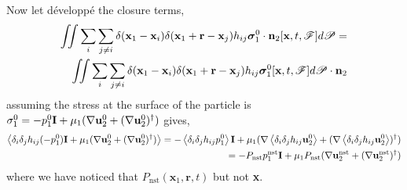 \documentclass[12pt]{My_preprint}
\begin{document}
Now let développé the closure terms,
\begin{align*}
    \iint
    \sum_i  
    \sum_{j\neq i}
    \delta(\textbf{x}_1-\textbf{x}_i)
    \delta(\textbf{x}_1+\textbf{r}-\textbf{x}_j)h_{ij} 
    \bm\sigma_1^0 \cdot \textbf{n}_2 [\textbf{x},t,\mathscr{F}]
    d\mathscr{P}
    = \\
    \iint
    \sum_i  
    \sum_{j\neq i}
    \delta(\textbf{x}_1-\textbf{x}_i)
    \delta(\textbf{x}_1+\textbf{r}-\textbf{x}_j)h_{ij} 
    \bm \sigma_1^0 [\textbf{x},t,\mathscr{F}]
    d\mathscr{P}\cdot \textbf{n}_2
\end{align*} 
assuming the stress at the surface of the particle is  $\sigma_1^0  = -p_1^0 \textbf{I} + \mu_1 (\mathbf{\nabla} \textbf{u}_2^0+  (\mathbf{\nabla} \textbf{u}_2^0)^\dagger)$ gives, 
\begin{align*}
    \left<\delta_i \delta_j h_{ij} (-p_1^0) \textbf{I} + \mu_1 (\mathbf{\nabla} \textbf{u}_2^0+  (\mathbf{\nabla} \textbf{u}_2^0)^\dagger)\right>
    = 
    - \left<\delta_i \delta_j h_{ij} p_1^0\right> \textbf{I} 
    + \mu_1 (\mathbf{\nabla}  \left<\delta_i \delta_j h_{ij}\textbf{u}_2^0\right>+  (\mathbf{\nabla}  \left<\delta_i \delta_j h_{ij}\textbf{u}_2^0\right>)^\dagger)\\
    = 
    - P_\text{nst} p_1^\text{nst} \textbf{I} 
    + \mu_1 P_\text{nst}(\mathbf{\nabla}  \textbf{u}_2^\text{nst}+  (\mathbf{\nabla}  \textbf{u}_2^\text{nst})^\dagger)\\
\end{align*}
where we have noticed that $P_\text{nst}(\textbf{x}_1,\textbf{r},t)$ but not \textbf{x}. 
\end{document}
